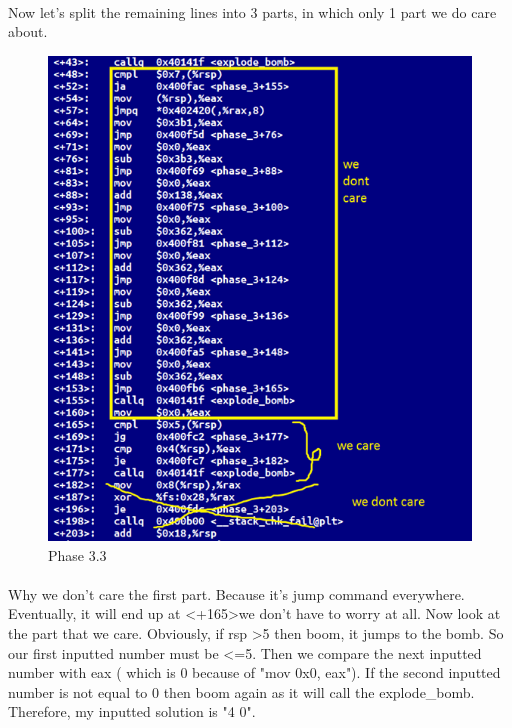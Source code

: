 \documentclass[a4paper]{article}
\begin{document}
\paragraph{}
Now let's split the remaining lines into 3 parts, in which only 1 part we do care about. 

\begin{figure}[h!]
  \includegraphics[width=\linewidth]{bai3_3.png}
  \caption{Phase 3.3}
  \label{}
\end{figure}

\paragraph{}
Why we don't care the first part. Because it's jump command everywhere. Eventually, it will end up at \textless +165\textgreater we don't have to worry at all. Now look at the part that we care. Obviously, if rsp \textgreater 5 then boom, it jumps to the bomb. So our first inputted number must be \textless=5.  Then we compare the next inputted number with eax ( which is 0 because of "mov 0x0, eax"). If the second inputted number is not equal to 0 then boom again as it will call the explode\_bomb. Therefore, my inputted solution is "4 0". 
\end{document}
